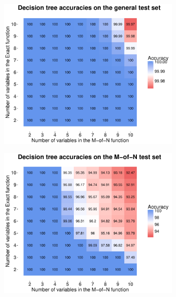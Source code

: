 \documentclass[letterpaper]{article} %
\begin{document}
 \begin{figure}
    \centering
    \begin{subfigure}[t]{0.45\textwidth}
        \includegraphics[width = 1 \linewidth]{Figures/Heatmap_ME_DT_general.pdf}
		\caption{}       
        \label{fig:Heatmap_ME_DT_general}
    \end{subfigure}%

    \begin{subfigure}[t]{0.45\textwidth}
        \includegraphics[width = 1 \linewidth]{Figures/Heatmap_ME_DT_M.pdf}
		\caption{}       
        \label{fig:Heatmap_ME_DT_M}
    \end{subfigure}%


\end{figure}
\end{document}
